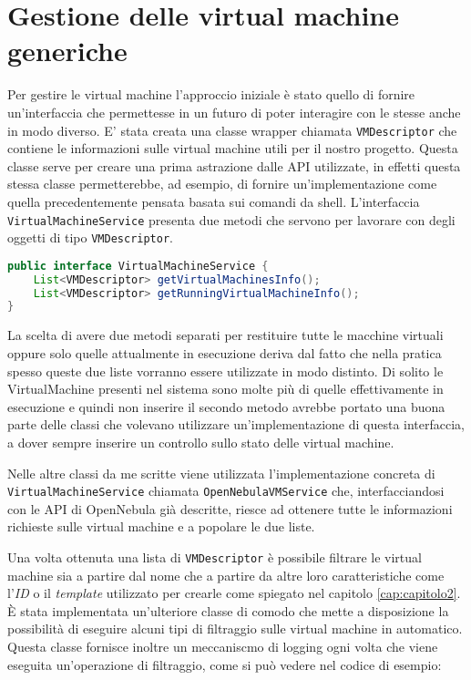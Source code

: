 \section{Gestione delle virtual machine generiche}
Per gestire le virtual machine l'approccio iniziale è stato quello di fornire un'interfaccia che permettesse in un futuro di poter interagire con le stesse anche in modo diverso.
E' stata creata una classe wrapper chiamata \texttt{VMDescriptor} che contiene le informazioni sulle virtual machine utili per il nostro progetto. Questa classe serve per creare una prima astrazione dalle API utilizzate, in effetti questa stessa classe permetterebbe, ad esempio, di fornire un'implementazione come quella precedentemente pensata basata sui comandi da shell.
L'interfaccia \texttt{VirtualMachineService} presenta due metodi che servono per lavorare con degli oggetti di tipo \texttt{VMDescriptor}.
\begin{lstlisting}[language=Java, caption=VirtualMachineService, label=code:VirtualMachineService, xleftmargin=1em]
public interface VirtualMachineService {
    List<VMDescriptor> getVirtualMachinesInfo();
    List<VMDescriptor> getRunningVirtualMachineInfo();
}
\end{lstlisting}
La scelta di avere due metodi separati per restituire tutte le macchine virtuali oppure solo quelle attualmente in esecuzione deriva dal fatto che nella pratica spesso queste due liste vorranno essere utilizzate in modo distinto. Di solito le VirtualMachine presenti nel sistema sono molte più di quelle effettivamente in esecuzione e quindi non inserire il secondo metodo avrebbe portato una buona parte delle classi che volevano utilizzare un'implementazione di questa interfaccia, a dover sempre inserire un controllo sullo stato delle virtual machine.\par
Nelle altre classi da me scritte viene utilizzata l'implementazione concreta di \texttt{VirtualMachineService} chiamata \texttt{OpenNebulaVMService} che, interfacciandosi con le API di OpenNebula già descritte, riesce ad ottenere tutte le informazioni richieste sulle virtual machine e a popolare le due liste.\par
Una volta ottenuta una lista di \texttt{VMDescriptor} è possibile filtrare le virtual machine sia a partire dal nome che a partire da altre loro caratteristiche come l'\emph{ID} o il \emph{template} utilizzato per crearle come spiegato nel capitolo \ref{cap:capitolo2}.
È stata implementata un'ulteriore classe di comodo che mette a disposizione la possibilità di eseguire alcuni tipi di filtraggio sulle virtual machine in automatico. Questa classe fornisce inoltre un meccaniscmo di logging ogni volta che viene eseguita un'operazione di filtraggio, come si può vedere nel codice di esempio:
